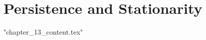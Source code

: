 %

\let\textcircled=\pgftextcircled
\chapter{Persistence and Stationarity}
\label{chap:stress_testing}

{"chapter_13_content.tex"}
